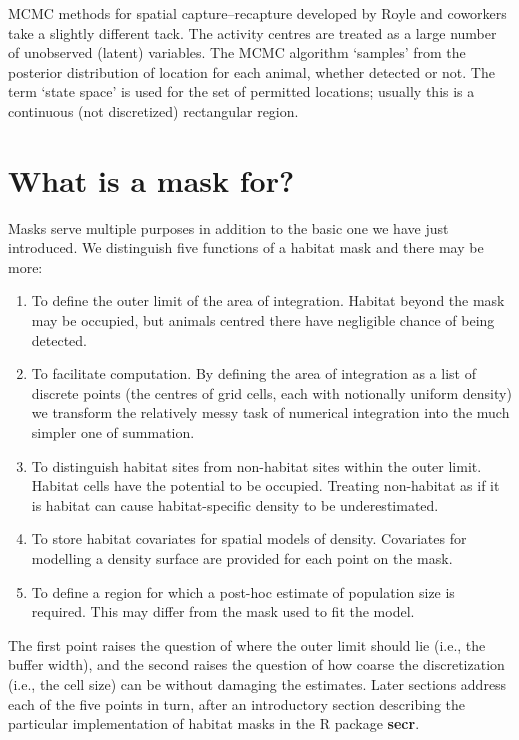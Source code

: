 \documentclass[
]{book}
\begin{document}
MCMC methods for spatial capture--recapture developed by Royle and coworkers \citep{rcsg14} take a slightly different tack. The activity centres are treated as a large number of unobserved (latent) variables. The MCMC algorithm `samples' from the posterior distribution of location for each animal, whether detected or not. The term `state space' is used for the set of permitted locations; usually this is a continuous (not discretized) rectangular region.

\section{What is a mask for?}\label{maskwhatfor}

Masks serve multiple purposes in addition to the basic one we have just introduced. We distinguish five functions of a habitat mask and there may be more:

\begin{enumerate}
\def\labelenumi{\arabic{enumi}.}
\item
  To define the outer limit of the area of integration. Habitat beyond the mask may be occupied, but animals centred there have negligible chance of being detected.
\item
  To facilitate computation. By defining the area of integration as a list of discrete points (the centres of grid cells, each with notionally uniform density) we transform the relatively messy task of numerical integration into the much simpler one of summation.
\item
  To distinguish habitat sites from non-habitat sites within the outer limit. Habitat cells have the potential to be occupied. Treating non-habitat as if it is habitat can cause habitat-specific density to be underestimated.
\item
  To store habitat covariates for spatial models of density. Covariates for modelling a density surface are provided for each point on the mask.
\item
  To define a region for which a post-hoc estimate of population size is required. This may differ from the mask used to fit the model.
\end{enumerate}

The first point raises the question of where the outer limit should lie (i.e., the buffer width), and the second raises the question of how coarse the discretization (i.e., the cell size) can be without damaging the estimates. Later sections address each of the five points in turn, after an introductory section describing the particular implementation of habitat masks in the R package \textbf{secr}.
\end{document}
